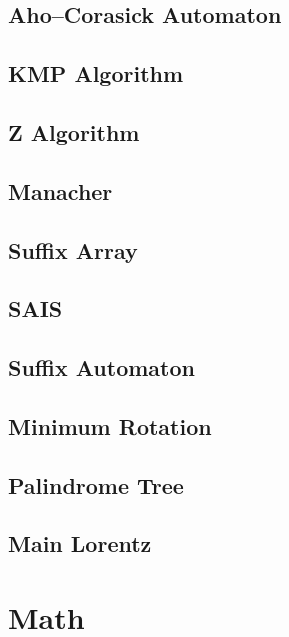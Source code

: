 \subsection{Aho–Corasick Automaton}

\subsection{KMP Algorithm}

\subsection{Z Algorithm}
\subsection{Manacher}
\subsection{Suffix Array}
\subsection{SAIS}
\subsection{Suffix Automaton}

\subsection{Minimum Rotation}
\subsection{Palindrome Tree}

\subsection{Main Lorentz}

\section{Math}
% 
